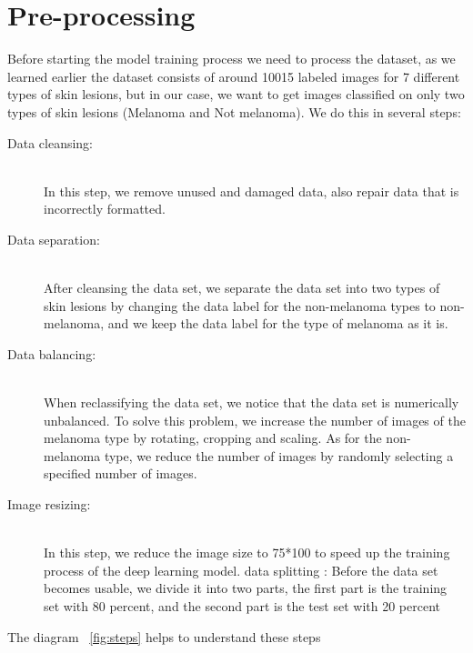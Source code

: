 \section{Pre-processing}
    Before starting the model training process we need to process the dataset, as we learned earlier the dataset consists of around 10015 labeled images for 7 different types of skin lesions, but in our case, we want to get images classified on only two types of skin lesions (Melanoma and Not melanoma). We do this in several steps:

    \begin{description}
        \item[Data cleansing: ] \hfill \\  In this step, we remove unused and damaged data, also repair data that is incorrectly formatted.

        \item[Data separation: ] \hfill \\  After cleansing the data set, we separate the data set into two types of skin lesions by changing the data label for the non-melanoma types to non-melanoma, and we keep the data label for the type of melanoma as it is.

        \item[Data balancing: ] \hfill \\  When reclassifying the data set, we notice that the data set is numerically unbalanced. To solve this problem, we increase the number of images of the melanoma type by rotating, cropping and scaling. As for the non-melanoma type, we reduce the number of images by randomly selecting a specified number of images.

        \item[Image resizing: ] \hfill \\  In this step, we reduce the image size to 75*100 to speed up the training process of the deep learning model. data splitting : Before the data set becomes usable, we divide it into two parts, the first part is the training set with 80 percent, and the second part is the test set with 20 percent
    \end{description}

        The diagram ~\ref{fig:steps} helps to understand these steps

